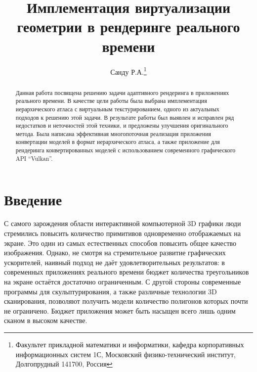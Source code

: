 \documentclass[12pt]{extarticle}
\begin{document}
\title{Имплементация виртуализации геометрии в рендеринге реального времени}

\author{Санду Р.А.\footnote{Факультет прикладной математики и информатики, кафедра корпоративных информационных систем 1С, Московский физико-технический институт, Долгопрудный 141700, Россия}}

\maketitle
\begin{abstract}
Данная работа посвящена решению задачи адаптивного рендеринга в приложениях реального времени. В качестве цели работы была выбрана имплементация иерархического атласа с виртуальным текстурированием, одного из актуальных подходов к решению этой задачи. В результате работы был выявлен и исправлен ряд недостатков и неточностей этой техники, и предложены улучшения оригинального метода. Была написана эффективная многопоточная реализация приложения конвертации моделей в формат иерархического атласа, а также приложение для рендеринга конвертированных моделей с использованием современного графического API ``Vulkan''.
\end{abstract}
\thispagestyle{empty}

\newpage
\tableofcontents
\newpage

\section{Введение}
\label{sec:intro}
С самого зарождения области интерактивной компьютерной 3D графики люди стремились повысить количество примитивов одновременно отображаемых на экране. Это один из самых естественных способов повысить общее качество изображения. Однако, не смотря на стремительное развитие графических ускорителей, наивный подход не даёт удовлетворительных результатов: в современных приложениях реального времени бюджет количества треугольников на экране остаётся достаточно ограниченным. С другой стороны современные программы для скульптурирования, а также различные технологии 3D сканирования, позволяют получить модели количество полигонов которых почти не ограничено. Бюджет приложения может быть насыщен всего лишь одним сканом в высоком качестве.
\end{document}
